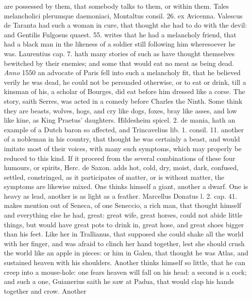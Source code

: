 {are possessed by them, that somebody talks to them, or within them.
Tales melancholici plerumque daemoniaci, Montaltus consil. 26. ex
Avicenna. Valescus de Taranta had such a woman in cure, that
thought she had to do with the devil: and Gentilis Fulgosus quaest. 55.
writes that he had a melancholy friend, that  had a black man in
the likeness of a soldier still following him wheresoever he was.
Laurentius cap. 7. hath many stories of such as have thought themselves
bewitched by their enemies; and some that would eat no meat as being
dead. \emph{Anno} 1550 an advocate of Paris fell into such a
melancholy fit, that he believed verily he was dead, he could not be
persuaded otherwise, or to eat or drink, till a kinsman of his, a
scholar of Bourges, did eat before him dressed like a corse. The story,
saith Serres, was acted in a comedy before Charles the Ninth. Some
think they are beasts, wolves, hogs, and cry like dogs, foxes, bray
like asses, and low like kine, as King Praetus' daughters.
Hildesheim spicel. 2. de mania, hath an example of a Dutch baron
so affected, and Trincavelius lib. 1. consil. 11. another of a nobleman
in his country, that thought he was certainly a beast, and would
imitate most of their voices, with many such symptoms, which may
properly be reduced to this kind.
If it proceed from the several combinations of these four humours, or
spirits, Herc. de Saxon. adds hot, cold, dry, moist, dark, confused,
settled, constringed, as it participates of matter, or is without
matter, the symptoms are likewise mixed. One thinks himself a giant,
another a dwarf. One is heavy as lead, another is as light as a
feather. Marcellus Donatus l. 2. cap. 41. makes mention out of Seneca,
of one Seneccio, a rich man, that thought himself and everything
else he had, great: great wife, great horses, could not abide little
things, but would have great pots to drink in, great hose, and great
shoes bigger than his feet. Like her in Trallianus, that supposed
she could shake all the world with her finger, and was afraid to clinch
her hand together, lest she should crush the world like an apple in
pieces: or him in Galen, that thought he was Atlas, and sustained
heaven with his shoulders. Another thinks himself so little, that he
can creep into a mouse-hole: one fears heaven will fall on his head: a
second is a cock; and such a one, Guianerius saith he saw at
Padua, that would clap his hands together and crow. Another
}
